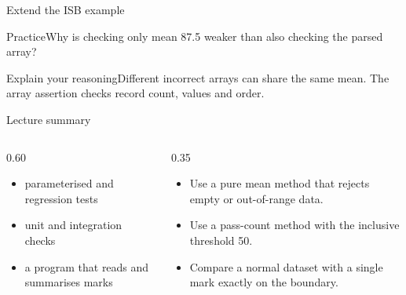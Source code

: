 \documentclass[10pt,aspectratio=169]{beamer}
\begin{document}
\begin{frame}[fragile,t]{Extend the ISB example}
\begin{alertblock}{Practice}Why is checking only mean 87.5 weaker than also checking the parsed array?\end{alertblock}\vspace{3mm}\begin{exampleblock}{Explain your reasoning}Different incorrect arrays can share the same mean. The array assertion checks record count, values and order.\end{exampleblock}
\end{frame}
\begin{frame}[fragile,t]{Lecture summary}
\begin{columns}[T,onlytextwidth]\begin{column}{0.60\textwidth}
\begin{itemize}
\item parameterised and regression tests
\item unit and integration checks
\item a program that reads and summarises marks
\end{itemize}
\end{column}\begin{column}{0.35\textwidth}\small
\begin{itemize}
\item Use a pure mean method that rejects empty or out-of-range data.
\item Use a pass-count method with the inclusive threshold 50.
\item Compare a normal dataset with a single mark exactly on the boundary.
\end{itemize}
\end{column}\end{columns}
\end{frame}
\end{document}
